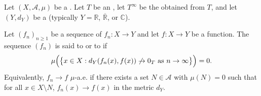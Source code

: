 \begin{definition} \label{definition:almost_sure_convergence_of_a_sequence_of_measurable_functions_from_a_measure_space_to_a_metric_space_valued_in_an_ordered_commutative_monoid_with_adjoined_infinity}
Let $(X, \mathcal{A}, \mu)$ be a . Let $T$ be an , let $T^\infty$ be the  obtained from $T$, and let $(Y, d_Y)$ be a  (typically $Y = \mathbb{R}$, $\overline{\mathbb{R}}$, or $\mathbb{C}$).

Let $(f_n)_{n \geq 1}$ be a sequence of  $f_n : X \to Y$ and let $f : X \to Y$ be a function. The sequence $(f_n)$ is said to  or to  if
$$\mu\Bigl(\bigl\{x \in X : d_Y(f_n(x), f(x)) \not\to 0_T \text{ as } n \to \infty\bigr\}\Bigr) = 0.$$
Equivalently, $f_n \to f$ $\mu$-a.e. if there exists a set $N \in \mathcal{A}$ with $\mu(N) = 0$ such that for all $x \in X \setminus N$, $f_n(x) \to f(x)$ in the metric $d_Y$.
\end{definition}
